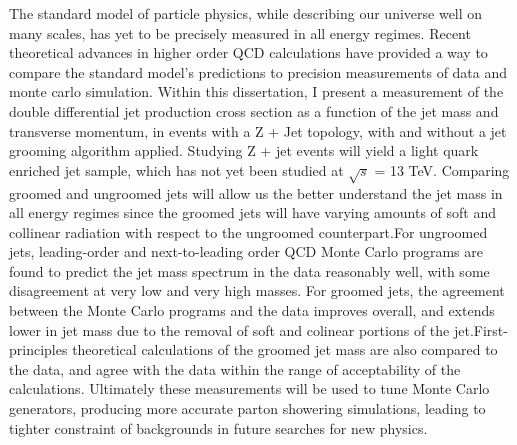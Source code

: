 
The standard model of particle physics, while describing our universe well on many scales, has yet to be precisely measured in all energy regimes. Recent theoretical advances in higher order QCD calculations have provided a way to compare the standard model's predictions to precision measurements of data and monte carlo simulation. Within this dissertation, I present a measurement of the double differential jet production cross section as a function of the jet mass and transverse momentum, in events with a Z + Jet topology, with and without a jet grooming algorithm applied. Studying Z + jet events will yield a light quark enriched jet sample, which has not yet been studied at $\sqrt{s}$ = 13 TeV. Comparing groomed and ungroomed jets will allow us the better understand the jet mass in all energy regimes since the groomed jets will have varying amounts of soft and collinear radiation with respect to the ungroomed counterpart.For ungroomed jets, leading-order and next-to-leading order QCD Monte Carlo programs are found to predict the jet mass spectrum in the data reasonably well, with some disagreement at very low and very high masses. For groomed jets, the agreement between the Monte Carlo programs and the data improves overall, and extends lower in jet mass due to the removal of soft and colinear portions of the jet.First-principles theoretical calculations of the groomed jet mass are also compared to the data, and agree with the data within the range of acceptability of the calculations. Ultimately these measurements will be used to tune Monte Carlo generators, producing more accurate parton showering simulations, leading to tighter constraint of backgrounds in future searches for new physics.
